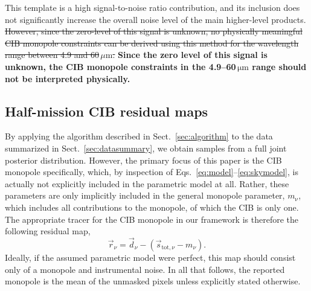\documentclass{aa}
\newcommand{\dv}[0]{\vec{d}}
\newcommand{\s}[0]{\vec{s}}
\renewcommand{\r}[0]{\vec{r}}
\begin{document}
This template is a high
signal-to-noise ratio contribution, and its inclusion does not
significantly increase the overall noise level of the main
higher-level products. 
\sout{However, since the zero-level of this signal is
unknown, no physically meaningful CIB monopole constraints can be derived using this
method 
for the wavelength range between 4.9 and
60$\,\mu\mathrm{m}$.}
\textbf{Since the zero level of this signal is unknown, the CIB monopole constraints in the 4.9--60\,$\mathrm{\mu m}$ range should not be interpreted physically.}

\subsection{Half-mission CIB residual maps}

By applying the algorithm described in Sect.~\ref{sec:algorithm} to the data
summarized in Sect.~\ref{sec:datasummary}, we obtain samples from a full joint
posterior distribution. However, the primary focus of this paper is the CIB
monopole specifically, which, by inspection of
Eqs.~\eqref{eq:model}--\eqref{eq:skymodel}, is actually not explicitly included
in the parametric model at all. Rather, these parameters are only implicitly
included in the general monopole parameter, $m_{\mathrm{\nu}}$, which includes
all contributions to the monopole, of which the CIB is only one. The
appropriate tracer for the CIB monopole in our framework is therefore the
following residual map,
\begin{equation}
\r_{\nu} = \dv_{\nu} - \left(\s_{\mathrm{tot},\nu} - m_{\nu}\right).
\end{equation}
Ideally, if the assumed parametric model were perfect, this map should
consist only of a monopole and instrumental noise. In all that follows, the reported monopole is the mean of the unmasked pixels unless explicitly stated otherwise.
\end{document}
